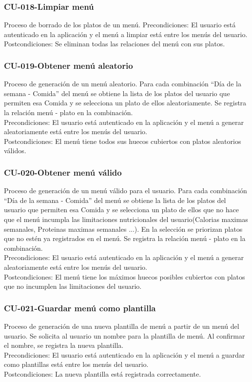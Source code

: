 \documentclass[12pt, a4paper, twoside]{book}
\begin{document}
	\subsubsection{CU-018-Limpiar menú}
	Proceso de borrado de los platos de un menú.
	Precondiciones: El usuario está autenticado en la aplicación y el menú a limpiar está entre los menús del usuario.\\
	Postcondiciones: Se eliminan todas las relaciones del menú con sus platos.
	\subsubsection{CU-019-Obtener menú aleatorio}
	Proceso de generación de un menú aleatorio.
	Para cada combinación ``Día de la semana - Comida'' del menú se obtiene la lista de los platos del usuario que permiten esa Comida y se selecciona un plato de ellos aleatoriamente.
	Se registra la relación menú - plato en la combinación.\\
	Precondiciones: El usuario está autenticado en la aplicación y el menú a generar aleatoriamente está entre los menús del usuario.\\
	Postcondiciones: El menú tiene todos sus huecos cubiertos con platos aleatorios válidos.
	\subsubsection{CU-020-Obtener menú válido}
	Proceso de generación de un menú válido para el usuario.
	Para cada combinación ``Día de la semana - Comida'' del menú se obtiene la lista de los platos del usuario que permiten esa Comida y se selecciona un plato de ellos que no hace que el menú incumpla las limitaciones nutricionales del usuario(Calorias maximas semanales, Proteinas maximas semanales ...). En la selección se priorizan platos que no estén ya registrados en el menú.
	Se registra la relación menú - plato en la combinación.\\
	Precondiciones: El usuario está autenticado en la aplicación y el menú a generar aleatoriamente está entre los menús del usuario.\\
	Postcondiciones: El menú tiene los máximos huecos posibles cubiertos con platos que no incumplen las limitaciones del usuario.
	\subsubsection{CU-021-Guardar menú como plantilla}
	Proceso de generación de una nueva plantilla de menú a partir de un menú del usuario.
	Se solicita al usuario un nombre para la plantilla de menú.
	Al confirmar el nombre, se registra la nueva plantilla.\\
	Precondiciones: El usuario está autenticado en la aplicación y el menú a guardar como plantillas está entre los menús del usuario.\\
	Postcondiciones: La nueva plantilla está registrada correctamente.
\end{document}
